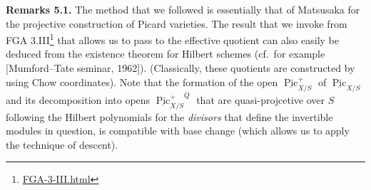 \documentclass{article}
\renewcommand{\href}[2]{#2\footnote{\url{#1}}}
\newenvironment{rmenv}[1]
  {\phantomsection\par\smallskip\noindent\textbf{#1.}\rmfamily}
  {\par\smallskip}
\theoremstyle{definition}
\theoremstyle{definition}
\theoremstyle{definition}
\theoremstyle{definition}
\theoremstyle{remark}
\begin{document}
\leavevmode{}%
\begin{rmenv}{Remarks 5.1}
The method that we followed is essentially that of Matsusaka for the projective construction of Picard varieties.
The result that we invoke from \href{FGA-3-III.html}{FGA 3.III} that allows us to pass to the effective quotient can also easily be deduced from the existence theorem for Hilbert schemes (cf.~for example {[}Mumford--Tate seminar, 1962{]}).
(Classically, these quotients are constructed by using Chow coordinates).
Note that the formation of the open \(\underline{\operatorname{Pic}}_{X/S}^+\) of \(\underline{\operatorname{Pic}}_{X/S}\) and its decomposition into opens \({\underline{\operatorname{Pic}}_{X/S}^+}^Q\) that are quasi-projcetive over \(S\) following the Hilbert polynomials for the \emph{divisors} that define the invertible modules in question, is compatible with base change (which allows us to apply the technique of descent).

\end{rmenv}
\end{document}
